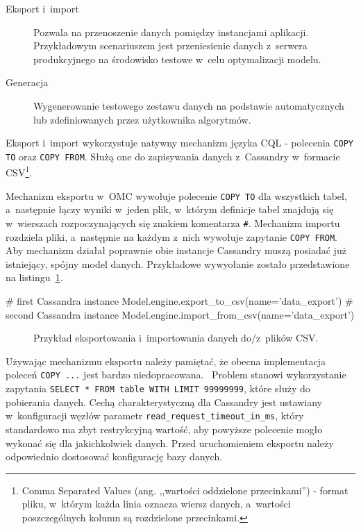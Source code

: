 \begin{description}
	\item[Eksport i~import] Pozwala na przenoszenie danych pomiędzy instancjami aplikacji. Przykładowym scenariuszem jest przeniesienie danych z~serwera produkcyjnego na środowisko testowe w~celu optymalizacji modelu.
	\item[Generacja] Wygenerowanie testowego zestawu danych na podstawie automatycznych lub zdefiniowanych przez użytkownika algorytmów.
\end{description}

Eksport i~import wykorzystuje natywny mechanizm języka CQL - polecenia \verb+COPY TO+ oraz \verb+COPY FROM+. Służą one do zapisywania danych z~Cassandry w~formacie CSV\footnote{Comma Separated Values (ang. ,,wartości oddzielone przecinkami'') - format pliku, w~którym każda linia oznacza wiersz danych, a~wartości poszczególnych kolumn są rozdzielone przecinkami.}. 

Mechanizm eksportu w~OMC wywołuje polecenie \verb+COPY TO+ dla wszystkich tabel, a~następnie łączy wyniki w~jeden plik, w~którym definicje tabel znajdują się w~wierszach rozpoczynających się znakiem komentarza \verb+#+. Mechanizm importu rozdziela pliki, a~następnie na każdym z~nich wywołuje zapytanie \verb+COPY FROM+. Aby mechanizm działał poprawnie obie instancje Cassandry muszą posiadać już istniejący, spójny model danych. Przykładowe wywyołanie zostało przedstawione na listingu~\ref{vrb:export_import_example}.

\begin{verbbox}[\footnotesize]
	# first Cassandra instance
	Model.engine.export_to_csv(name='data_export')
	# second Cassandra instance
	Model.engine.import_from_csv(name='data_export')
\end{verbbox}

\begin{figure}[ht!]
	\centering
	\theverbbox
	\caption{Przykład eksportowania i~importowania danych do/z~plików CSV.}
	\label{vrb:export_import_example}
\end{figure}

Używając mechanizmu eksportu należy pamiętać, że obecna implementacja poleceń \verb+COPY ...+ jest bardzo niedopracowana.~\cite{simple_data_importing_and_exporting} Problem stanowi wykorzystanie zapytania \verb+SELECT * FROM table WITH LIMIT 99999999+, które służy do pobierania danych. Cechą charakterystyczną dla Cassandry jest ustawiany w~konfiguracji węzłów parametr \verb+read_request_timeout_in_ms+, który standardowo ma zbyt restrykcyjną wartość, aby powyższe polecenie mogło wykonać się dla jakichkolwiek danych. Przed uruchomieniem eksportu należy odpowiednio dostosować konfigurację bazy danych.

